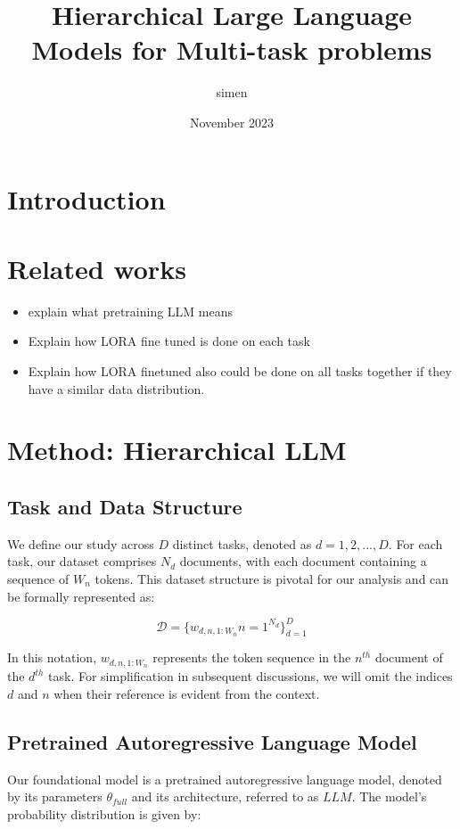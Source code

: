 \documentclass{article}
\title{Hierarchical Large Language Models for Multi-task problems}
\author{simen }
\date{November 2023}
\begin{document}
\maketitle

\section{Introduction}

\section{Related works}
\begin{itemize}
    \item explain what pretraining LLM means
    \item Explain how LORA fine tuned is done on each task
    \item Explain how LORA finetuned also could be done on all tasks together if they have a similar data distribution.
\end{itemize}


\section{Method: Hierarchical LLM}

\subsection{Task and Data Structure}
We define our study across $D$ distinct tasks, denoted as $d=1,2,...,D$. For each task, our dataset comprises $N_d$ documents, with each document containing a sequence of $W_n$ tokens. This dataset structure is pivotal for our analysis and can be formally represented as:

\begin{equation} \label{eq:data}
\mathcal{D} = \{{ w_{d,n,1:W_n} }{n=1}^{N_d} \}_{d=1}^D
\end{equation}

In this notation, $w_{d,n,1:W_n}$ represents the token sequence in the $n^{th}$ document of the $d^{th}$ task. For simplification in subsequent discussions, we will omit the indices $d$ and $n$ when their reference is evident from the context.

\subsection{Pretrained Autoregressive Language Model}
Our foundational model is a pretrained autoregressive language model, denoted by its parameters $\theta_{full}$ and its architecture, referred to as $LLM$. The model's probability distribution is given by:
\end{document}
